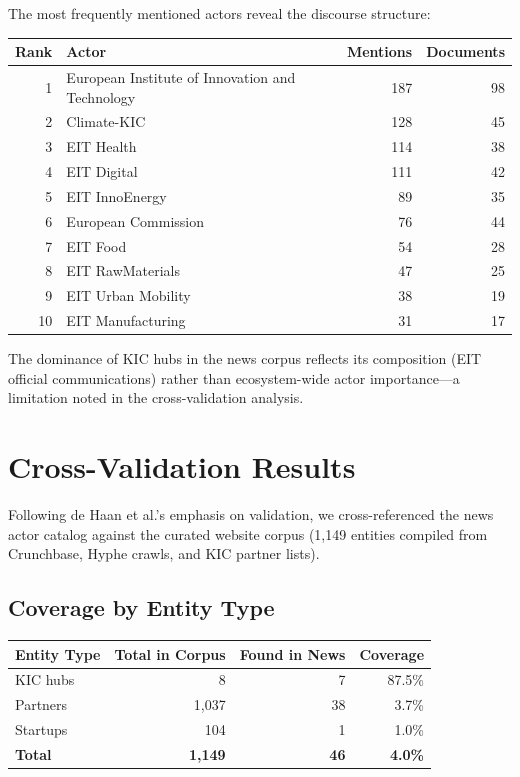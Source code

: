 \documentclass[../main.tex]{subfiles}
\begin{document}
The most frequently mentioned actors reveal the discourse structure:

\tableminimal
\begin{center}
\begin{tabular}{@{}rlrr@{}}
\toprule
\textbf{Rank} & \textbf{Actor} & \textbf{Mentions} & \textbf{Documents} \\
\midrule
1 & European Institute of Innovation and Technology & 187 & 98 \\
2 & Climate-KIC & 128 & 45 \\
3 & EIT Health & 114 & 38 \\
4 & EIT Digital & 111 & 42 \\
5 & EIT InnoEnergy & 89 & 35 \\
6 & European Commission & 76 & 44 \\
7 & EIT Food & 54 & 28 \\
8 & EIT RawMaterials & 47 & 25 \\
9 & EIT Urban Mobility & 38 & 19 \\
10 & EIT Manufacturing & 31 & 17 \\
\bottomrule
\end{tabular}
\end{center}

The dominance of KIC hubs in the news corpus reflects its composition (EIT official communications) rather than ecosystem-wide actor importance---a limitation noted in the cross-validation analysis.


\section{Cross-Validation Results}

Following de Haan et al.'s emphasis on validation, we cross-referenced the news actor catalog against the curated website corpus (1,149 entities compiled from Crunchbase, Hyphe crawls, and KIC partner lists).

\subsection{Coverage by Entity Type}

\tableminimal
\begin{center}
\begin{tabular}{@{}lrrr@{}}
\toprule
\textbf{Entity Type} & \textbf{Total in Corpus} & \textbf{Found in News} & \textbf{Coverage} \\
\midrule
KIC hubs & 8 & 7 & 87.5\% \\
Partners & 1,037 & 38 & 3.7\% \\
Startups & 104 & 1 & 1.0\% \\
\midrule
\textbf{Total} & \textbf{1,149} & \textbf{46} & \textbf{4.0\%} \\
\bottomrule
\end{tabular}
\end{center}
\end{document}
